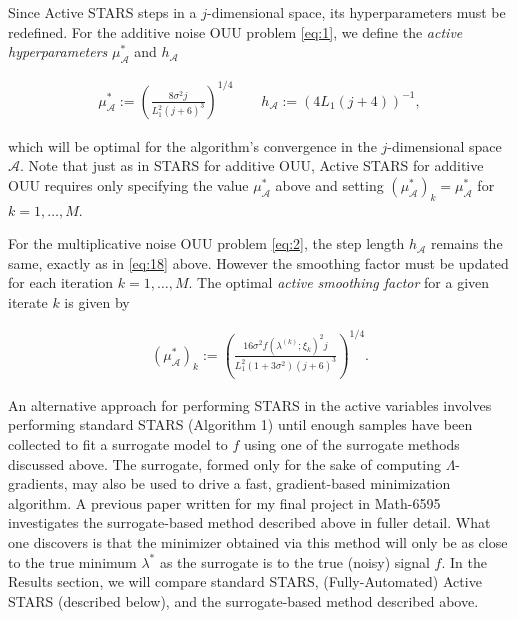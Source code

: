 \documentclass{amsart}
\newcommand{\A}{\mathcal{A}}
\begin{document}
\vspace{.25cm}

Since Active STARS steps in a $j$-dimensional space, its hyperparameters must be redefined. For the additive noise OUU problem \eqref{eq:1}, we define the \textit{active hyperparameters} $\mu_\A^*$ and $h_\A$

\begin{eqnarray} \label{eq:18}
\mu_\A^*:=\left( \frac{8\sigma^2 j}{L_1^2(j+6)^3}\right)^{1/4} \quad \quad h_\A:=(4L_1(j+4))^{-1},
\end{eqnarray} 

\noindent which will be optimal \cite{CW} for the algorithm's convergence in the $j$-dimensional space $\A.$ Note that just as in STARS for additive OUU, Active STARS for additive OUU requires only specifying the value $\mu_\A^*$ above and setting $(\mu^*_\A)_k=\mu_\A^*$ for $k=1,\ldots, M.$

For the multiplicative noise OUU problem \eqref{eq:2}, the step length $h_\A$ remains the same, exactly as in \eqref{eq:18} above. However the smoothing factor must be updated for each iteration $k=1,\ldots, M.$ The optimal \textit{active smoothing factor} for a given iterate $k$ is given by

\begin{eqnarray} \label{eq:19}
(\mu_\A^*)_k:=\left( \frac{16 \sigma^2 f(\lambda^{(k)};\xi_k)^2 j}{L_1^2(1+3\sigma^2)(j+6)^3}\right)^{1/4}.
\end{eqnarray} 

An alternative approach for performing STARS in the active variables involves performing standard STARS (Algorithm 1) until enough samples have been collected to fit a surrogate model to $f$ using one of the surrogate methods discussed above. The surrogate, formed only for the sake of computing $\Lambda$-gradients, may also be used to drive a fast, gradient-based minimization algorithm. %
A previous paper written for my final project in Math-6595 investigates the surrogate-based method described above in fuller detail. What one discovers is that the minimizer obtained via this method will only be as close to the true minimum $\lambda^*$ as the surrogate is to the true (noisy) signal $f$. In the Results section, we will compare standard STARS, (Fully-Automated) Active STARS (described below), and the surrogate-based method described above.
\end{document}
